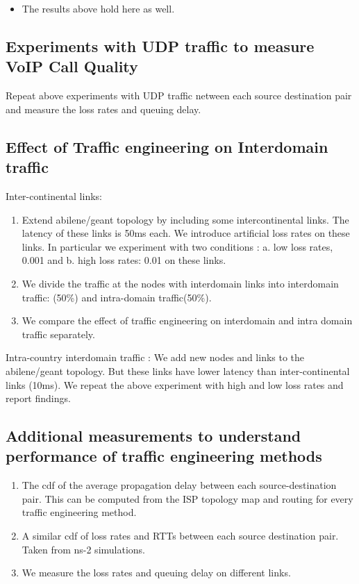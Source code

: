 \documentclass[a4paper,10pt]{article}
\begin{document}
\begin{itemize}
\item 
The results above hold here as well.
\end{itemize}

\subsection{Experiments with UDP traffic to measure VoIP Call Quality}

Repeat above experiments with UDP traffic netween each source destination pair and measure the loss rates and queuing delay.

\subsection{Effect of Traffic engineering on Interdomain traffic}

Inter-continental links: 

\begin{enumerate}
\item
Extend abilene/geant topology by including some intercontinental links. The latency of these links is 50ms each. We introduce artificial loss rates on these links. In particular we experiment with two conditions : a. low loss rates, 0.001 and b. high loss rates: 0.01 on these links.
\item
We divide the traffic at the  nodes with interdomain links into interdomain traffic: (50\%) and intra-domain traffic(50\%).
\item
We compare the effect of traffic engineering on interdomain and intra domain traffic separately.
\end{enumerate}

Intra-country interdomain traffic : We add new nodes and links to the abilene/geant topology. But these links have lower latency than inter-continental links (10ms). We repeat the above experiment with high and low loss rates and report findings.

\subsection{Additional measurements to understand performance of traffic engineering methods}

\begin{enumerate}
\item 
The cdf of the average propagation delay between each source-destination pair. This can be computed from the ISP topology map and routing for every traffic engineering method.
\item 
A similar cdf of loss rates  and RTTs between each source destination pair. Taken from ns-2 simulations.
\item 
We measure the loss rates and queuing delay on different links.
\end{enumerate}
\end{document}
